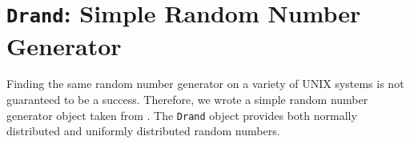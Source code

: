 \chapter{{\tt Drand}: \break Simple Random Number Generator}
\par
Finding the same random number generator on a variety of UNIX
systems is not guaranteed to be a success.
Therefore, we wrote a simple random number generator object
taken from \cite{and90-random}.
The {\tt Drand} object provides both normally distributed and
uniformly distributed random numbers.
